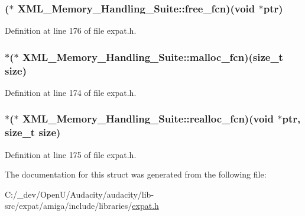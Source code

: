 \subsubsection[{\texorpdfstring{free\+\_\+fcn}{free_fcn}}]{($\ast$ X\+M\+L\+\_\+\+Memory\+\_\+\+Handling\+\_\+\+Suite\+::free\+\_\+fcn)({\bf void} $\ast$ptr)}\hypertarget{struct_x_m_l___memory___handling___suite_a5da6db22e9aba955d071875a589b1b42}{}\label{struct_x_m_l___memory___handling___suite_a5da6db22e9aba955d071875a589b1b42}


Definition at line 176 of file expat.\+h.

\subsubsection[{\texorpdfstring{malloc\+\_\+fcn}{malloc_fcn}}]{ $\ast$($\ast$ X\+M\+L\+\_\+\+Memory\+\_\+\+Handling\+\_\+\+Suite\+::malloc\+\_\+fcn)(size\+\_\+t {\bf size})}\hypertarget{struct_x_m_l___memory___handling___suite_ac2e78cef37b336e5d7ad804b98a64f0f}{}\label{struct_x_m_l___memory___handling___suite_ac2e78cef37b336e5d7ad804b98a64f0f}


Definition at line 174 of file expat.\+h.

\subsubsection[{\texorpdfstring{realloc\+\_\+fcn}{realloc_fcn}}]{ $\ast$($\ast$ X\+M\+L\+\_\+\+Memory\+\_\+\+Handling\+\_\+\+Suite\+::realloc\+\_\+fcn)({\bf void} $\ast$ptr, size\+\_\+t {\bf size})}\hypertarget{struct_x_m_l___memory___handling___suite_a1e7cafd4148e65aa745b72f869aa121d}{}\label{struct_x_m_l___memory___handling___suite_a1e7cafd4148e65aa745b72f869aa121d}


Definition at line 175 of file expat.\+h.



The documentation for this struct was generated from the following file\+:\begin{DoxyCompactItemize}
\item 
C\+:/\+\_\+dev/\+Open\+U/\+Audacity/audacity/lib-\/src/expat/amiga/include/libraries/\hyperlink{amiga_2include_2libraries_2expat_8h}{expat.\+h}\end{DoxyCompactItemize}

